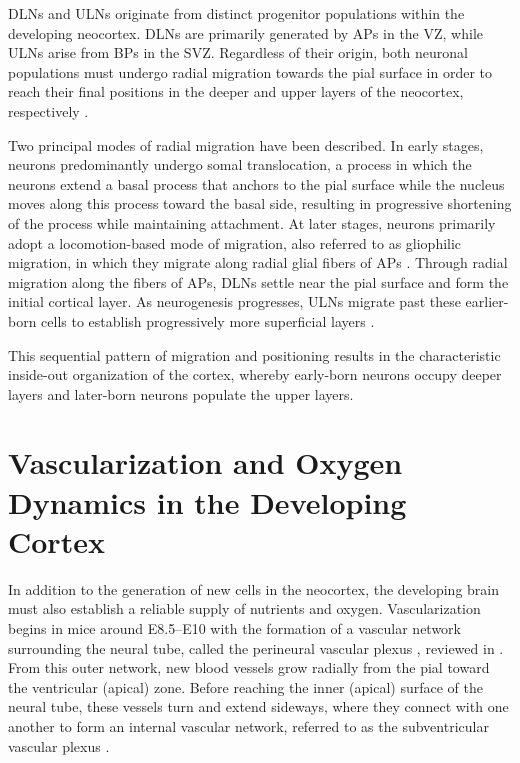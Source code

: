 DLNs and ULNs originate from distinct progenitor populations within the developing neocortex. DLNs are primarily generated by APs in the VZ, while ULNs arise from BPs in the SVZ. Regardless of their origin, both neuronal populations must undergo radial migration towards the pial surface in order to reach their final positions in the deeper and upper layers of the neocortex, respectively \citep{NADARAJAHModesNeuronalMigration2002}.


Two principal modes of radial migration have been described. In early stages, neurons predominantly undergo somal translocation, a process in which the neurons extend a basal process that anchors to the pial surface while the nucleus moves along this process toward the basal side, resulting in progressive shortening of the process while maintaining attachment. At later stages, neurons primarily adopt a locomotion-based mode of migration, also referred to as gliophilic migration, in which they migrate along radial glial fibers of APs \citep{NADARAJAHModesNeuronalMigration2002}.
Through radial migration along the fibers of APs, DLNs settle near the pial surface and form the initial cortical layer. As neurogenesis progresses, ULNs migrate past these earlier-born cells to establish progressively more superficial layers \citep{BUCHSBAUMNeuronalMigrationCNS2019}.


This sequential pattern of migration and positioning results in the characteristic inside-out organization of the cortex, whereby early-born neurons occupy deeper layers and later-born neurons populate the upper layers.

\section{Vascularization and Oxygen Dynamics in the Developing Cortex
}
In addition to the generation of new cells in the neocortex, the developing brain must also establish a reliable supply of nutrients and oxygen. Vascularization begins in mice around E8.5–E10 with the formation of a vascular network surrounding the neural tube, called the perineural vascular plexus \citep{HOGANNeuralTubePatterns2004},
reviewed in \citep{JAMESNeuronalActionDeveloping2011}. From this outer network, new blood vessels grow radially from the pial toward the ventricular (apical) zone. Before reaching the inner (apical) surface of the neural tube, these vessels turn and extend sideways, where they connect with one another to form an internal vascular network, referred to as the subventricular vascular plexus \citep{TATAVascularisationCentralNervous2015, FANTINNRP1ActsCell2013}.


